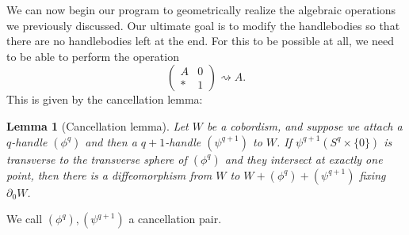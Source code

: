 \documentclass[a4paper, 12pt]{article}
\newtheorem{lemma}[thm]{Lemma}
\theoremstyle{definition}
\begin{document}
We can now begin our program to geometrically realize the algebraic operations we previously discussed. Our ultimate goal is to modify the handlebodies so that there are no handlebodies left at the end. For this to be possible at all, we need to be able to perform the operation
\[
  \begin{pmatrix}
    A & 0\\
    * & 1
  \end{pmatrix} \rightsquigarrow A.
\]
This is given by the cancellation lemma:
\begin{lemma}[Cancellation lemma]
  Let $W$ be a cobordism, and suppose we attach a $q$-handle $(\phi^q)$ and then a $q + 1$-handle $(\psi^{q + 1})$ to $W$. If $\psi^{q + 1}(S^q \times \{0\})$ is transverse to the transverse sphere of $(\phi^q)$ and they intersect at exactly one point, then there is a diffeomorphism from $W$ to $W + (\phi^q) + (\psi^{q + 1})$ fixing $\partial_0 W$.
\end{lemma}
We call $(\phi^q), (\psi^{q + 1})$ a cancellation pair.
\end{document}
